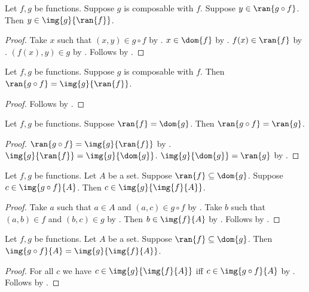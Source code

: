 \begin{proposition}\label{ran_of_circ_elim}
    Let $f, g$ be functions.
    Suppose $g$ is composable with $f$.
    Suppose $y\in \ran{g\circ f}$.
    Then $y\in \img{g}{\ran{f}}$.
\end{proposition}
\begin{proof}
    Take $x$ such that $(x, y)\in g\circ f$ by .
    $x\in\dom{f}$ by .
    $f(x)\in\ran{f}$ by .
    $(f(x), y)\in g$
        by .
    Follows by .
\end{proof}

\begin{proposition}\label{ran_of_circ}
    Let $f, g$ be functions.
    Suppose $g$ is composable with $f$.
    Then $\ran{g\circ f} = \img{g}{\ran{f}}$.
\end{proposition}
\begin{proof}
    Follows by .
\end{proof}

\begin{proposition}\label{ran_circ_exact}
    Let $f, g$ be functions.
    Suppose $\ran{f} = \dom{g}$.
    Then $\ran{g\circ f} = \ran{g}$.
\end{proposition}
\begin{proof}
    $\ran{g\circ f} = \img{g}{\ran{f}}$ by .
    $\img{g}{\ran{f}} = \img{g}{\dom{g}}$.
    $\img{g}{\dom{g}} = \ran{g}$ by .
\end{proof}


\begin{proposition}\label{img_of_circ_elim}
    Let $f, g$ be functions.
    Let $A$ be a set.
    Suppose $\ran{f}\subseteq \dom{g}$.
    Suppose $c\in\img{g\circ f}{A}$.
    Then $c\in\img{g}{\img{f}{A}}$.
\end{proposition}
\begin{proof}
    Take $a$ such that $a\in A$ and $(a,c)\in g\circ f$ by .
    Take $b$ such that $(a,b)\in f$ and $(b, c)\in g$ by .
    Then $b\in\img{f}{A}$ by .
    Follows by .
\end{proof}

\begin{proposition}\label{img_of_circ}
    Let $f, g$ be functions.
    Let $A$ be a set.
    Suppose $\ran{f}\subseteq\dom{g}$.
    Then $\img{g\circ f}{A} = \img{g}{\img{f}{A}}$.
\end{proposition}
\begin{proof}
    For all $c$ we have $c\in\img{g}{\img{f}{A}}$
        iff $c\in\img{g\circ f}{A}$
        by .
    Follows by .
\end{proof}

